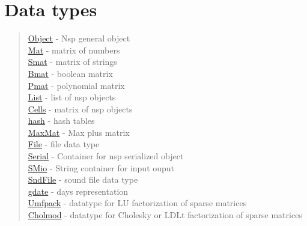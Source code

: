 \chapter*{Data types}


\begin{quote}
\noindent
\hyperlink{Object}{Object} - Nsp general object  \\
\hyperlink{Mat}{Mat} - matrix of numbers \\
\hyperlink{Smat}{Smat} - matrix of strings  \\
\hyperlink{Bmat}{Bmat} - boolean matrix  \\
\hyperlink{Pmat}{Pmat} - polynomial matrix  \\
\hyperlink{list}{List} - list  of nsp objects  \\
\hyperlink{Cells}{Cells} - matrix of nsp objects  \\
\hyperlink{hash}{hash} - hash tables  \\
\hyperlink{MaxMat}{MaxMat} - Max plus matrix  \\
\hyperlink{File}{File} - file data type  \\
\hyperlink{Serial}{Serial} - Container for nsp serialized object \\
\hyperlink{SMio}{SMio} - String container for input ouput \\
\hyperlink{SndFile}{SndFile} - sound file data type \\
\hyperlink{gdate}{gdate} - days representation \\
\hyperlink{Umfpack}{Umfpack} - datatype for LU factorization of sparse matrices \\
\hyperlink{Cholmod}{Cholmod} - datatype for Cholesky or LDLt factorization of sparse matrices \\
\end{quote}


 
 
 
 
 
 
 
 
 
 
 
 
 
 
 
 

